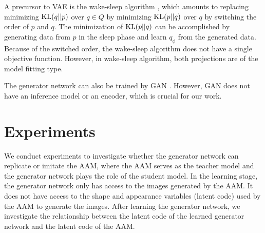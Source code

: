 \documentclass{article}
\begin{document}
A precursor to VAE is the wake-sleep algorithm  \cite{hinton1995wake}, which amounts to replacing minimizing ${\rm KL}(q||p)$ over $q \in Q$ by minimizing ${\rm KL}(p||q)$ over $q$ by switching the order of $p$ and $q$. The minimization of ${\rm KL}(p||q)$ can be accomplished by generating data from $p$ in the sleep phase and learn $q_\phi$ from the generated data. Because of the switched order, the wake-sleep algorithm does not have a single objective function. However, in wake-sleep algorithm, both projections are of the model fitting type.

The generator network can also be trained by GAN \cite{goodfellow2014generative}. However, GAN does not have an inference model or an encoder, which is crucial for our work.




\section{Experiments} \label{sec:exp} %

We conduct experiments to investigate whether the generator network can replicate or imitate the AAM, where the AAM serves as the teacher model and the generator network plays the role of the student model. In the learning stage, the generator network only has access to the images generated by the AAM. It does not have access to the shape and appearance variables (latent code) used by the AAM to generate the images. After learning the generator network, we investigate the relationship between the latent code of the learned generator network and the latent code of the AAM.
\end{document}
